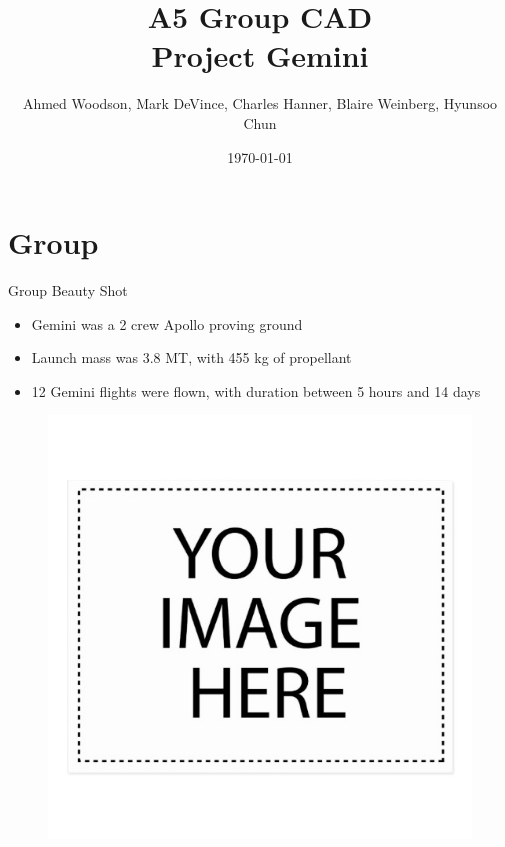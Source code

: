 \documentclass[10pt]{beamer}
\title{A5 Group CAD \\Project Gemini}
\author{Ahmed Woodson, Mark DeVince, Charles Hanner, Blaire Weinberg, Hyunsoo Chun}
\date{\today}
\begin{document}
	\frame{\titlepage}
	
	\section{Group}
	
	\begin{frame}{Group Beauty Shot}
\begin{minipage}{0.49\textwidth}
	\begin{itemize}
		\item Gemini was a 2 crew Apollo proving ground
		\item Launch mass was 3.8 MT, with 455 kg of propellant
		\item 12 Gemini flights were flown, with duration between 5 hours and 14 days
	\end{itemize}
\end{minipage}%
\begin{minipage}{0.49\textwidth}
	\begin{figure}
		\centering
		\includegraphics[width=\textwidth]{Group_Beauty.png}
	\end{figure}
	
\end{minipage}
\end{frame}
\end{document}
